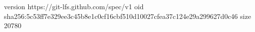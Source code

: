 version https://git-lfs.github.com/spec/v1
oid sha256:5c53ff7e329ee3c45b8e1c0cf16cbf510d10027cfea37c124e29a299627d0c46
size 20780
